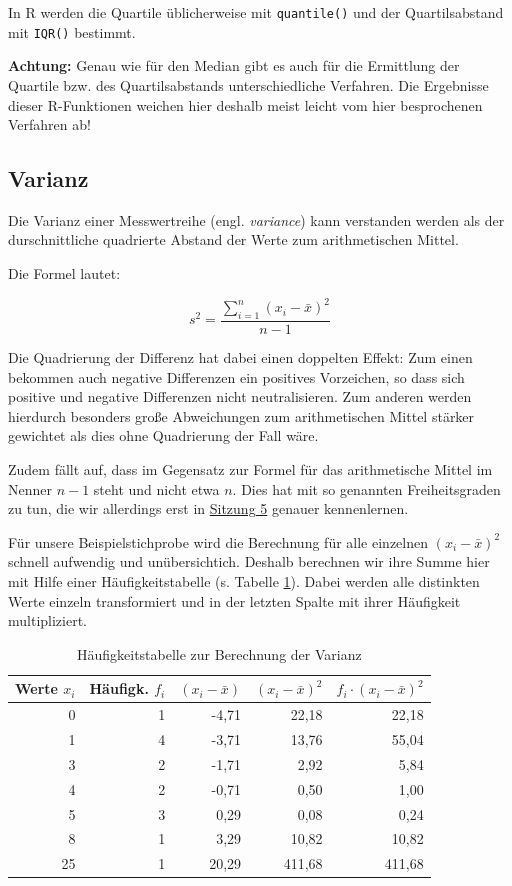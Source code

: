 \documentclass[
  11pt,
  ngerman,
  a4paper,
]{report}
\newenvironment{rtip}{
  \medskip
  \begin{tcolorbox}[colframe=purple,colback=light_gray,title=Softwarehinweis]
}{
  \end{tcolorbox}
  \medskip
}
\begin{document}
\begin{rtip}
In R werden die Quartile üblicherweise mit \verb|quantile()| und der Quartilsabstand mit \verb|IQR()| bestimmt.
\end{rtip}

\textbf{Achtung:} Genau wie für den Median gibt es auch für die Ermittlung der Quartile bzw. des Quartilsabstands unterschiedliche Verfahren. Die Ergebnisse dieser R-Funktionen weichen hier deshalb meist leicht vom hier besprochenen Verfahren ab!

\hypertarget{varianz}{%
\subsection{Varianz}\label{varianz}}

Die Varianz einer Messwertreihe (engl. \emph{variance}) kann verstanden werden als der durschnittliche quadrierte Abstand der Werte zum arithmetischen Mittel.

Die Formel lautet:

\[
  s^2=\frac{\sum\limits_{i=1}^{n}(x_{i}-\bar{x})^2}{n-1}
  \label{eq:var}
\]

Die Quadrierung der Differenz hat dabei einen doppelten Effekt: Zum einen bekommen auch negative Differenzen ein positives Vorzeichen, so dass sich positive und negative Differenzen nicht neutralisieren. Zum anderen werden hierdurch besonders große Abweichungen zum arithmetischen Mittel stärker gewichtet als dies ohne Quadrierung der Fall wäre.

Zudem fällt auf, dass im Gegensatz zur Formel für das arithmetische Mittel im Nenner \(n-1\) steht und nicht etwa \(n\). Dies hat mit so genannten Freiheitsgraden zu tun, die wir allerdings erst in \protect\hyperlink{freiheitsgrade}{Sitzung 5} genauer kennenlernen.

Für unsere Beispielstichprobe wird die Berechnung für alle einzelnen \((x_i-\bar{x})^2\) schnell aufwendig und unübersichtich. Deshalb berechnen wir ihre Summe hier mit Hilfe einer Häufigkeitstabelle (s. Tabelle \ref{tab:freq}). Dabei werden alle distinkten Werte einzeln transformiert und in der letzten Spalte mit ihrer Häufigkeit multipliziert.

\begin{table}

\caption{\label{tab:freq}Häufigkeitstabelle zur Berechnung der Varianz}
\centering
\begin{tabular}[t]{rrrrr}
\toprule
Werte $x_i$ & Häufigk. $f_i$ & $(x_i- \bar{x})$ & $(x_i- \bar{x})^2$ & $f_i\cdot(x_i -\bar{x})^2$\\
\midrule
0 & 1 & -4,71 & 22,18 & 22,18\\
1 & 4 & -3,71 & 13,76 & 55,04\\
3 & 2 & -1,71 & 2,92 & 5,84\\
4 & 2 & -0,71 & 0,50 & 1,00\\
5 & 3 & 0,29 & 0,08 & 0,24\\
8 & 1 & 3,29 & 10,82 & 10,82\\
25 & 1 & 20,29 & 411,68 & 411,68\\
\bottomrule
\end{tabular}
\end{table}
\end{document}
